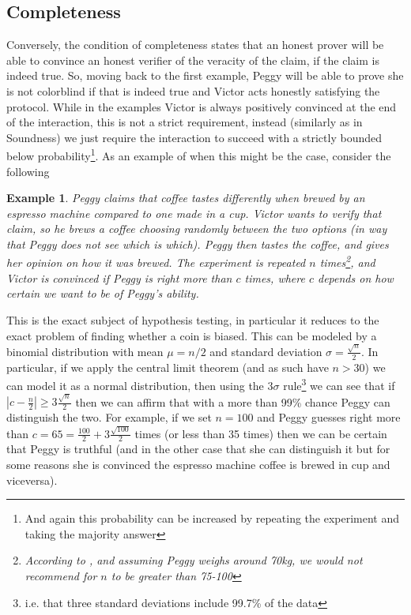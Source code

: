 \documentclass{article}
\newtheorem{example}{Example}
\begin{document}
\subsection{Completeness}
Conversely, the condition of completeness states that an honest prover will be able to convince an honest verifier of the veracity of the claim, if the claim is indeed true. So, moving back to the first example, Peggy will be able to prove she is not colorblind if that is indeed true and Victor acts honestly satisfying the protocol. While in the examples Victor is always positively convinced at the end of the interaction, this is not a strict requirement, instead (similarly as in Soundness) we just require the interaction to succeed with a strictly bounded below probability\footnote{And again this probability can be increased by repeating the experiment and taking the majority answer}. As an example of when this might be the case, consider the following \begin{example}
    Peggy claims that coffee tastes differently when brewed by an espresso machine compared to one made in a cup. Victor wants to verify that claim, so he brews a coffee choosing randomly between the two options (in way that Peggy does not see which is which). Peggy then tastes the coffee, and gives her opinion on how it was brewed. The experiment is repeated $n$ times\footnote{According to \cite{chambersChemIDplus0000302272XFSBVAOIAHNAPCNPVHKAFCSAN}, and assuming Peggy weighs around 70kg, we would not recommend for $n$ to be greater than 75-100}, and Victor is convinced if Peggy is right more than $c$ times, where $c$ depends on how certain we want to be of Peggy's ability.
\end{example}

This is the exact subject of hypothesis testing, in particular it reduces to the exact problem of finding whether a coin is biased. This can be modeled by a binomial distribution with mean $\mu = n/2$ and standard deviation $\sigma = \frac{\sqrt{n}}{2}$. In particular, if we apply the central limit theorem (and as such have $n > 30$) we can model it as a normal distribution, then using the $3\sigma$ rule\footnote{i.e. that three standard deviations include 99.7\% of the data} we can see that if $|c - \frac{n}{2}| \geq 3\frac{\sqrt{n}}{2}$ then we can affirm that with a more than 99\% chance Peggy can distinguish the two. For example, if we set $n = 100$ and Peggy guesses right more than $c = 65 = \frac{100}{2} + 3 \frac{\sqrt{100}}{2}$ times (or less than 35 times) then we can be certain that Peggy is truthful (and in the other case that she can distinguish it but for some reasons she is convinced the espresso machine coffee is brewed in cup and viceversa).
\end{document}
